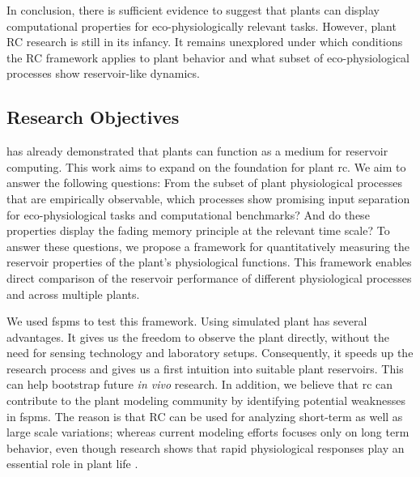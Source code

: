 In conclusion, there is sufficient evidence to suggest that plants can display computational properties for eco-physiologically relevant tasks.
However, plant RC research is still in its infancy. It remains unexplored under which conditions the RC framework applies to plant behavior and what subset of eco-physiological processes show reservoir-like dynamics.


\subsection{Research Objectives}

\citet{pieters_reservoir_2022} has already demonstrated that plants can function as a medium for reservoir computing.
This work aims to expand on the foundation for plant \acrshort{rc}. 
We aim to answer the following questions:
From the subset of plant physiological processes that are empirically observable, which processes show promising input separation for eco-physiological tasks and computational benchmarks? 
And do these properties display the fading memory principle at the relevant time scale?
To answer these questions, we propose a framework for quantitatively measuring the reservoir properties of the plant's physiological functions.
This framework enables direct comparison of the reservoir performance of different physiological processes and across multiple plants.


We used \acrshort{fspm}s to test this framework. 
Using simulated plant has several advantages.
It gives us the freedom to observe the plant directly, without the need for sensing technology and laboratory setups.
Consequently, it speeds up the research process and gives us a first intuition into suitable plant reservoirs. 
This can help bootstrap future \textit{in vivo} research.
In addition, we believe that \acrshort{rc} can contribute to the plant modeling community by identifying potential weaknesses in \acrshort{fspm}s.
The reason is that RC can be used for analyzing short-term as well as large scale variations; whereas current modeling efforts focuses only on long term behavior,
even though research shows that rapid physiological responses play an essential role in plant life \citep{alarcon_substantial_1994, deswaef2015a}.
